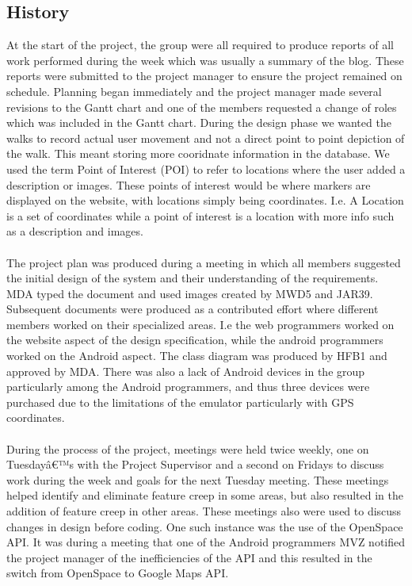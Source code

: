 \documentclass[12pt]{article}
\begin{document}
\subsection{History}
At the start of the project, the group were all required to produce reports of all work performed during the week which was usually a summary of the blog. These reports were submitted to the project manager to ensure the project remained on schedule. Planning began immediately and the project manager made several revisions to the Gantt chart and one of the members requested a change of roles which was included in the Gantt chart. During the design phase we wanted the walks to record actual user movement and not a direct point to point depiction of the walk. This meant storing more cooridnate information in the database. We used the term Point of Interest (POI) to refer to locations where the user added a description or images. These points of interest would be where markers are displayed on the website, with locations simply being coordinates. I.e. A Location is a set of coordinates while a point of interest is a location with more info such as a description and images.
\\\\
The project plan was produced during a meeting in which all members suggested the initial design of the system and their understanding of the requirements. MDA typed the document and used images created by MWD5 and JAR39. Subsequent documents were produced as a contributed effort where different members worked on their specialized areas. I.e the web programmers worked on the website aspect of the design specification, while the android programmers worked on the Android aspect. The class diagram was produced by HFB1 and approved by MDA. There was also a lack of Android devices in the group particularly among the Android programmers, and thus three devices were purchased due to the limitations of the emulator particularly with GPS coordinates.
\\\\
During the process of the project, meetings were held twice weekly, one on Tuesdayâ€™s with the Project Supervisor and a second on Fridays to discuss work during the week and goals for the next Tuesday meeting. These meetings helped identify and eliminate feature creep in some areas, but also resulted in the addition of feature creep in other areas. These meetings also were used to discuss changes in design before coding. One such instance was the use of the OpenSpace API. It was during a meeting that one of the Android programmers MVZ notified the project manager of the inefficiencies of the API and this resulted in the switch from OpenSpace to Google Maps API.
\end{document}
